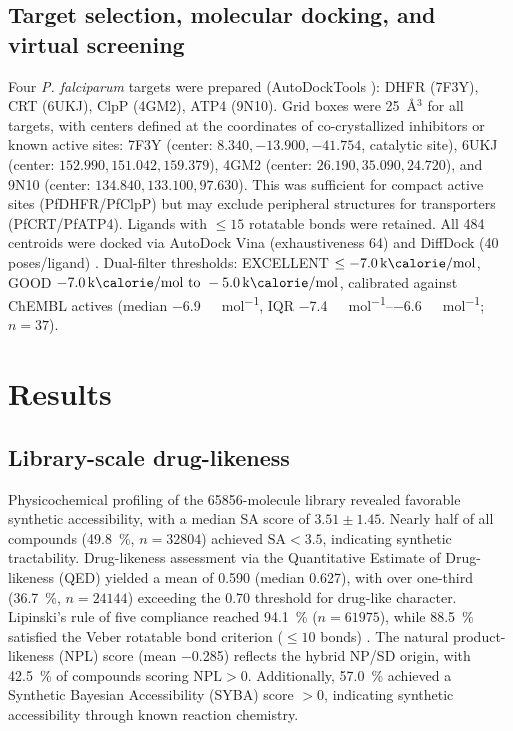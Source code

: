 \documentclass[journal=jcisd8,manuscript=article]{achemso}
\begin{document}
\subsection{Target selection, molecular docking, and virtual screening}

Four \emph{P. falciparum} targets were prepared (AutoDockTools \cite{Eberhardt2021}): DHFR (7F3Y), CRT (6UKJ), ClpP (4GM2), ATP4 (9N10). Grid boxes were \qty{25}{\angstrom}$^3$ for all targets, with centers defined at the coordinates of co-crystallized inhibitors or known active sites: 7F3Y (center: $8.340, -13.900, -41.754$, catalytic site), 6UKJ (center: $152.990, 151.042, 159.379$), 4GM2 (center: $26.190, 35.090, 24.720$), and 9N10 (center: $134.840, 133.100, 97.630$). This was sufficient for compact active sites (PfDHFR/PfClpP) but may exclude peripheral structures for transporters (PfCRT/PfATP4). Ligands with $\leq \num{15}$ rotatable bonds were retained. All \num{484} centroids were docked via AutoDock Vina (exhaustiveness \num{64}) and DiffDock (\num{40} poses/ligand) \cite{Corso2023}. Dual-filter thresholds: EXCELLENT $\leq \qty{-7.0}{\kilo\calorie\per\mole}$, GOOD $\qtyrange{-7.0}{-5.0}{\kilo\calorie\per\mole}$, calibrated against ChEMBL actives (median \qty{-6.9}{\kilo\calorie\per\mole}, IQR \qtyrange{-7.4}{-6.6}{\kilo\calorie\per\mole}; $n=37$).

\section{Results}
\label{sec:results}

\subsection{Library-scale drug-likeness}
\label{sec:results-library}

Physicochemical profiling of the \num{65856}-molecule library revealed favorable synthetic accessibility, with a median SA score of $\num{3.51} \pm \num{1.45}$. Nearly half of all compounds (\qty{49.8}{\percent}, $n = \num{32804}$) achieved $\text{SA} < \num{3.5}$, indicating synthetic tractability. Drug-likeness assessment via the Quantitative Estimate of Drug-likeness (QED) yielded a mean of \num{0.590} (median \num{0.627}), with over one-third (\qty{36.7}{\percent}, $n = \num{24144}$) exceeding the \num{0.70} threshold for drug-like character. Lipinski's rule of five compliance reached \qty{94.1}{\percent} ($n = \num{61975}$), while \qty{88.5}{\percent} satisfied the Veber rotatable bond criterion ($\leq\num{10}$ bonds) \cite{Lipinski2004, Veber2002, Bayliss2016, Hann2004}. The natural product-likeness (NPL) score (mean \num{-0.285}) reflects the hybrid NP/SD origin, with \qty{42.5}{\percent} of compounds scoring $\text{NPL} > \num{0}$. Additionally, \qty{57.0}{\percent} achieved a Synthetic Bayesian Accessibility (SYBA) score $> \num{0}$, indicating synthetic accessibility through known reaction chemistry.
\end{document}
